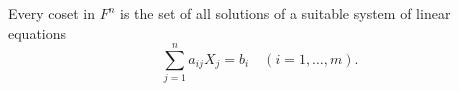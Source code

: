 Every coset in $F^n$ is the set of all solutions of a suitable system of linear equations
$$\sum_{j=1}^{n} a_{ij} X_j = b_i \quad (i = 1, \ldots, m).$$
